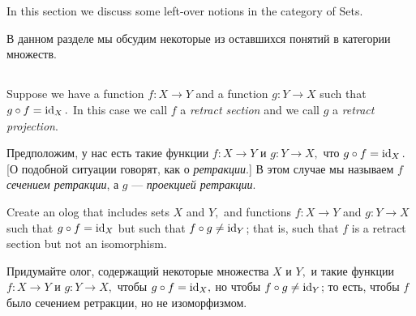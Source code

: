 \documentclass[../main/CT4S-EN-RU]{subfiles}
\begin{document}
\section{}

\begin{blockENG}
In this section we discuss some left-over notions in the category of Sets.
\end{blockENG}

\begin{blockRUS}
В данном разделе мы обсудим некоторые из оставшихся понятий в категории множеств. 
\end{blockRUS}


\subsection{}

\begin{definitionENG}
Suppose we have a function $f\colon X{→} Y$ and a function $g\colon Y{→} X$ such that $g\circ f=\operatorname{id}_X.$ In this case we call $f$ a {\em retract section} and we call $g$ a {\em retract projection}. 
\end{definitionENG}

\begin{definitionRUS}
Предположим, у нас есть такие функции $f\colon X{→} Y$ и $g\colon Y{→} X,$ что $g\circ f=\operatorname{id}_X.$ [О подобной ситуации говорят, как о {\em ретракции}.] В этом случае мы называем $f$ {\em сечением ретракции}, а $g$ — {\em проекцией ретракции}.
\end{definitionRUS}

\begin{exerciseENG}
Create an olog that includes sets $X$ and $Y,$ and functions $f\colon X{→} Y$ and $g\colon Y{→} X$ such that $g\circ f=\operatorname{id}_X$ but such that $f\circ g\neq\operatorname{id}_Y$; that is, such that $f$ is a retract section but not an isomorphism.
\end{exerciseENG}

\begin{exerciseRUS}
Придумайте олог, содержащий некоторые множества $X$ и $Y,$ и такие функции $f\colon X{→} Y$ и $g\colon Y{→} X,$ чтобы $g\circ f=\operatorname{id}_X,$ но чтобы $f\circ g\neq\operatorname{id}_Y$; то есть, чтобы $f$ было сечением ретракции, но не изоморфизмом.
\end{exerciseRUS}
\end{document}
